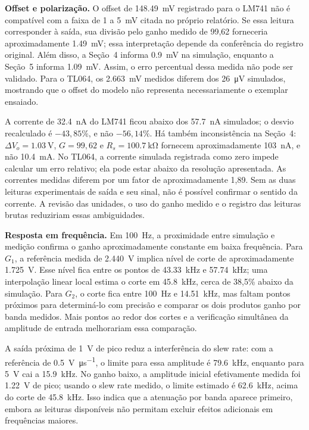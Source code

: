 \documentclass[11pt,a4paper]{article}
\begin{document}
\textbf{Offset e polarização.} O offset de \SI{148,49}{\milli\volt} registrado para o LM741 não é compatível com a faixa de 1 a \SI{5}{\milli\volt} citada no próprio relatório. Se essa leitura corresponder à saída, sua divisão pelo ganho medido de 99,62 forneceria aproximadamente \SI{1,49}{\milli\volt}; essa interpretação depende da conferência do registro original. Além disso, a Seção~4 informa \SI{0,9}{\milli\volt} na simulação, enquanto a Seção~5 informa \SI{1,09}{\milli\volt}. Assim, o erro percentual dessa medida não pode ser validado. Para o TL064, os \SI{2,663}{\milli\volt} medidos diferem dos \SI{26}{\micro\volt} simulados, mostrando que o offset do modelo não representa necessariamente o exemplar ensaiado.

A corrente de \SI{32,4}{\nano\ampere} do LM741 ficou abaixo dos \SI{57,7}{\nano\ampere} simulados; o desvio recalculado é $-43,85\%$, e não $-56,14\%$. Há também inconsistência na Seção~4: $\Delta V_o = \SI{1,03}{\volt}$, $G = 99,62$ e $R_s = \SI{100,7}{\kilo\ohm}$ fornecem aproximadamente \SI{103}{\nano\ampere}, e não \SI{10,4}{\milli\ampere}. No TL064, a corrente simulada registrada como zero impede calcular um erro relativo; ela pode estar abaixo da resolução apresentada. As correntes medidas diferem por um fator de aproximadamente 1,89. Sem as duas leituras experimentais de saída e seu sinal, não é possível confirmar o sentido da corrente. A revisão das unidades, o uso do ganho medido e o registro das leituras brutas reduziriam essas ambiguidades.

\textbf{Resposta em frequência.} Em \SI{100}{\hertz}, a proximidade entre simulação e medição confirma o ganho aproximadamente constante em baixa frequência. Para $G_1$, a referência medida de \SI{2,440}{\volt} implica nível de corte de aproximadamente \SI{1,725}{\volt}. Esse nível fica entre os pontos de \SI{43,33}{\kilo\hertz} e \SI{57,74}{\kilo\hertz}; uma interpolação linear local estima o corte em \SI{45,8}{\kilo\hertz}, cerca de 38,5\% abaixo da simulação. Para $G_2$, o corte fica entre \SI{100}{\hertz} e \SI{14,51}{\kilo\hertz}, mas faltam pontos próximos para determiná-lo com precisão e comparar os dois produtos ganho por banda medidos. Mais pontos ao redor dos cortes e a verificação simultânea da amplitude de entrada melhorariam essa comparação.

A saída próxima de \SI{1}{\volt} de pico reduz a interferência do slew rate: com a referência de \SI{0,5}{\volt\per\micro\second}, o limite para essa amplitude é \SI{79,6}{\kilo\hertz}, enquanto para \SI{5}{\volt} cai a \SI{15,9}{\kilo\hertz}. No ganho baixo, a amplitude inicial efetivamente medida foi \SI{1,22}{\volt} de pico; usando o slew rate medido, o limite estimado é \SI{62,6}{\kilo\hertz}, acima do corte de \SI{45,8}{\kilo\hertz}. Isso indica que a atenuação por banda aparece primeiro, embora as leituras disponíveis não permitam excluir efeitos adicionais em frequências maiores.
\end{document}
